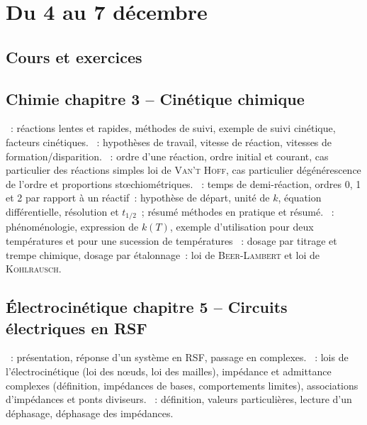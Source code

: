 \documentclass[a4paper, 12pt, final, garamond]{book}
\begin{document}
\setcounter{chapter}{9}

\chapter{Du 4 au 7 d\'ecembre}

\section{Cours et exercices}

\section*{Chimie chapitre 3 -- Cinétique chimique}
\begin{enumerate}[label=\Roman*]
	~: réactions lentes et rapides, méthodes de
	suivi, exemple de suivi cinétique, facteurs cinétiques.
	~: hypothèses de travail, vitesse de
	réaction, vitesses de formation/disparition.
	~: ordre d'une réaction,
	ordre initial et courant, cas particulier des réactions simples loi de
	\textsc{Van't Hoff}, cas particulier dégénérescence de l'ordre et
	proportions stœchiométriques.
	~: temps de demi-réaction, ordres 0, 1
	et 2 par rapport à un réactif~: hypothèse de départ, unité de $k$,
	équation différentielle, résolution et $t_{1/2}$~; résumé méthodes en
	pratique et résumé.
	~: phénoménologie, expression
	de $k(T)$, exemple d'utilisation pour deux températures et pour une
	sucession de températures
	~: dosage par
	titrage et trempe chimique, dosage par étalonnage~: loi de
	\textsc{Beer-Lambert} et loi de \textsc{Kohlrausch}.
\end{enumerate}

\section*{Électrocinétique chapitre 5 -- Circuits électriques en RSF}
\begin{enumerate}[label=\Roman*]
	~: présentation, réponse d'un système
	en RSF, passage en complexes.
	~: lois de l'électrocinétique (loi
	des nœuds, loi des mailles), impédance et admittance complexes
	(définition, impédances de bases, comportements limites), associations
	d'impédances et ponts diviseurs.
	~: définition, valeurs particulières,
	lecture d'un déphasage, déphasage des impédances.
\end{enumerate}
\end{document}
